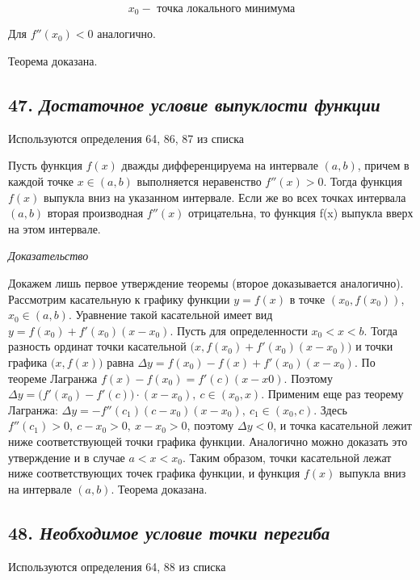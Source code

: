 $$
x_0 - \text{ точка локального минимума}
$$

Для $f''(x_0)<0$ аналогично.

Теорема доказана.
\newpage 
\subsection*{47. \textit{Достаточное условие выпуклости функции}}
\begin{Quote2} 
\small\centering 

Используются определения 64, 86, 87 из списка \end{Quote2} 

Пусть функция $f(x)$ дважды дифференцируема на интервале $(a, b)$, причем в каждой точке $x \in (a, b)$ выполняется неравенство $f''(x) > 0$. Тогда функция $f(x)$ выпукла вниз на указанном интервале. Если же во всех точках интервала $(a, b)$ вторая производная $f''(x)$ отрицательна, то функция f(x) выпукла вверх на этом интервале.
\vspace*{20pt} 

\textit{Доказательство}

Докажем лишь первое утверждение теоремы (второе доказывается аналогично). Рассмотрим касательную к графику функции $y = f(x)$ в точке $(x_0, f(x_0))$, $x_0 \in (a, b)$. Уравнение такой касательной имеет вид $y = f(x_0) + f'(x_0)(x - x_0)$. Пусть для определенности $x_0 < x < b$. Тогда разность ординат точки касательной $\big(x, f(x_0) + f'(x_0)(x - x_0)\big)$ и точки графика $\big(x, f(x)\big)$ равна $\Delta y = f(x_0) - f(x) + f'(x_0)(x - x_0).$ По теореме Лагранжа $f(x) - f(x_0) = f'(c)(x - x0).$ Поэтому $\Delta y = \big(f'(x_0) - f'(c)\big)\cdot(x - x_0), \ c \in (x_0, x).$ Применим еще раз теорему Лагранжа: $\Delta y = -f''(c_1)(c - x_0)(x - x_0),\ c_1 \in (x_0, c).$ Здесь $f''(c_1) > 0,\ c - x_0 > 0, \ x - x_0 > 0$, поэтому $\Delta y < 0$, и точка касательной лежит ниже соответствующей точки графика функции. Аналогично можно доказать это утверждение и в случае $a < x < x_0$. Таким образом, точки касательной лежат ниже соответствующих точек графика функции, и функция $f(x)$ выпукла вниз на интервале $(a, b)$. Теорема доказана.
\newpage 
\subsection*{48. \textit{Необходимое условие точки перегиба}}
\begin{Quote2} 
\small\centering 

Используются определения 64, 88 из списка \end{Quote2} 

